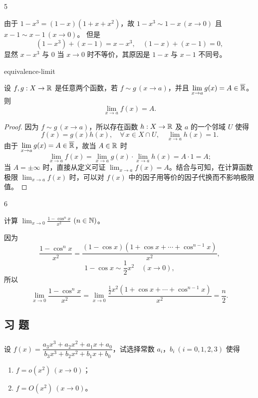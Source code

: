 \begin{sourceexample}{5}

由于 $1-x^3=(1-x)(1+x+x^2)$，故 $1-x^3\sim 1-x\,(x\to0)$ 且 $x-1\sim x-1\,(x\to0)$。
但是
\[(1-x^3)+(x-1)=x-x^3,\quad (1-x)+(x-1)=0,\]
显然 $x-x^3$ 与 $0$ 当 $x\to0$ 时不等价，其原因是 $1-x$ 与 $x-1$ 不同号。

\end{sourceexample}

\begin{mythm}{}{equivalence-limit}

设 $f,g:X\to\mathbb{R}$ 是任意两个函数，若 $f\sim g\,(x\to a)$，并且 $\displaystyle\lim_{x\to a}g(x)=A\in\overline{\mathbb{R}}$。则
\[\lim_{x\to a}f(x)=A.\]

\end{mythm}

\begin{proof}

因为 $f\sim g\,(x\to a)$，所以存在函数 $h:X\to\mathbb{R}$ 及 $a$ 的一个邻域 $U$ 使得
\[f(x)=g(x)h(x),\quad \forall\,x\in X\cap U,\quad \lim_{x\to a}h(x)=1.\]
由于 $\displaystyle\lim_{x\to a}g(x)=A\in\overline{\mathbb{R}}$，故当 $A\in\mathbb{R}$ 时
\[\lim_{x\to a}f(x)=\lim_{x\to a}g(x)\cdot\lim_{x\to a}h(x)=A\cdot1=A;\]
当 $A=\pm\infty$ 时，直接从定义可证 $\displaystyle\lim_{x\to a}f(x)=A$。结合与可知，在计算函数极限 $\displaystyle\lim_{x\to a}f(x)$ 时，可以对 $f(x)$ 中的因子用等价的因子代换而不影响极限值。

\end{proof}

\begin{sourceexample}{6}

计算 $\displaystyle\lim_{x\to0}\frac{1-\cos^n x}{x^2}$ $(n\in\mathbb{N})$。

因为
\[\frac{1-\cos^{n}x}{x^{2}}=\frac{(1-\cos x)(1+\cos x+\cdots+\cos^{n-1}x)}{x^{2}},\]
\[1-\cos x\sim\frac{1}{2}x^2\quad (x\to0),\]
所以
\[\lim_{x\to0}\frac{1-\cos^n x}{x^2}=\lim_{x\to0}\frac{\frac{1}{2}x^2(1+\cos x+\cdots+\cos^{n-1}x)}{x^2}=\frac{n}{2}.\]

\end{sourceexample}

\subsection*{习 题}

\begin{exercise}
	\item 设 \(f(x)=\dfrac{a_3x^3+a_2x^2+a_1x+a_0}{b_3x^3+b_2x^2+b_1x+b_0}\)，试选择常数 \(a_i\)，\(b_i\ (i=0,1,2,3)\) 使得
	\begin{enumerate}[label=\arabic*)]
		\item \(f=o(x^2)\ (x\to0)\)；
		\item \(f=O(x^2)\ (x\to0)\)。
	\end{enumerate}
\end{exercise}

